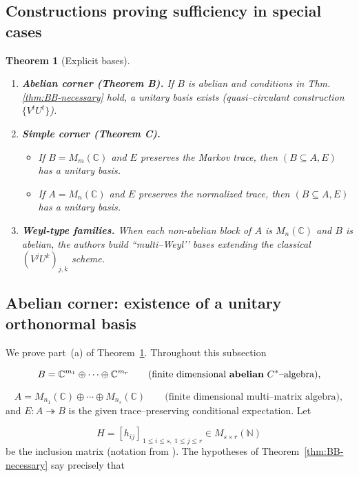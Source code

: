 \documentclass[11pt]{article}
\theoremstyle{mytheoremstyle}
\newtheorem{theorem}{Theorem}[section]
\theoremstyle{definition}
\theoremstyle{remark}
\newcommand{\bbC}{\mathbb{C}}
\newcommand{\bbN}{\mathbb{N}}
\newcommand{\Cst}{$C^{*}$}
\begin{document}
\subsection*{Constructions proving sufficiency in special cases}
\begin{theorem}[Explicit bases]\label{thm:BB-sufficient}
\leavevmode
\begin{enumerate}[label=\textup{(\alph*)}]
  \item \textbf{Abelian corner (Theorem B).}\; 
        If $B$ is abelian and conditions in
        Thm.\,\ref{thm:BB-necessary} hold,
        a unitary basis exists
        (quasi–circulant construction $\bigl\{V^{t}U^{t}\bigr\}$). 
  \item \textbf{Simple corner (Theorem C).}\; 
        \begin{itemize}[leftmargin=1.55em]
          \item If $B=M_m(\bbC)$ and $E$ preserves the Markov trace,
                then $(B\subseteq A,E)$ has a unitary basis.
          \item If $A=M_n(\bbC)$ and $E$ preserves the normalized trace,
                then $(B\subseteq A,E)$ has a unitary basis.
        \end{itemize}
  \item \textbf{Weyl-type families.}\; 
        When each non-abelian block of $A$ is $M_n(\bbC)$
        and $B$ is abelian,
        the authors build ``multi–Weyl’’ bases
        extending the classical $(V^{j}U^{k})_{j,k}$ scheme.
\end{enumerate}
\end{theorem}

\subsection{Abelian corner: existence of a unitary orthonormal basis}
\label{sec:abelian-corner}

We prove part~\textup{(a)} of Theorem~\ref{thm:BB-sufficient}.
Throughout this subsection

\[
  B = \bbC^{m_1}\oplus\cdots\oplus\bbC^{m_r}
  \qquad\text{(finite dimensional \textbf{abelian} \Cst–algebra)},
\]

\[
  A =M_{n_1}(\mathbb{C})\oplus\cdots\oplus M_{n_s}(\mathbb{C})
  \qquad\text{(finite dimensional multi–matrix algebra)},
\]
and
\( E : A \twoheadrightarrow B \)
is the given trace–preserving conditional expectation.
Let  

\[
  H =[h_{ij}]_{\,1\le i\le s,\;1\le j\le r}\in M_{s\times r}(\bbN)
\]
be the inclusion matrix (notation from \cite{BakshiBhat2025}).  
The hypotheses of Theorem~\ref{thm:BB-necessary} say precisely that  
\end{document}

